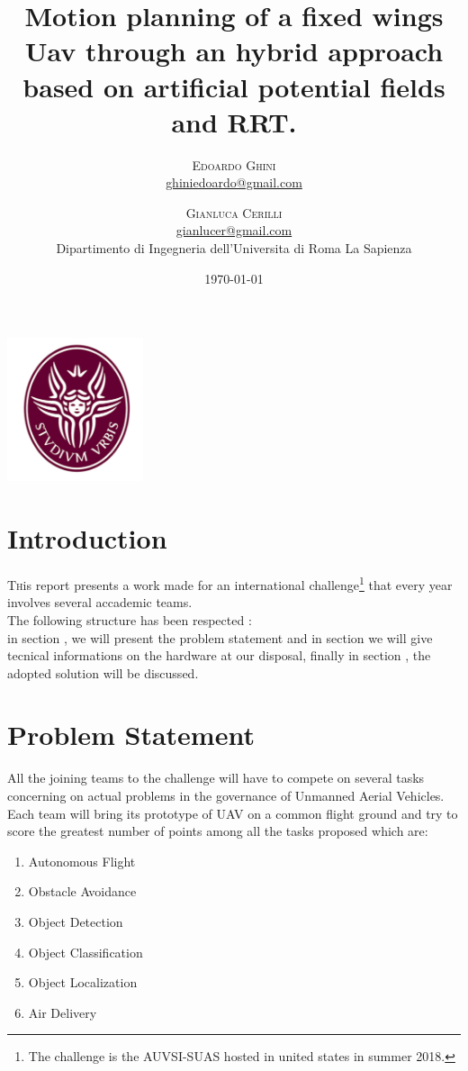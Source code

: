 \documentclass[oneside,onecolumn]{article}
\title{Motion planning of a fixed wings Uav through an hybrid approach based on artificial potential
  fields and RRT. } %
\author{%
  \textsc{Edoardo Ghini} \\[1ex] %
  \normalsize \href{mailto:ghiniedoardo@gmail.com}{ghiniedoardo@gmail.com} %
  \and %
  \textsc{Gianluca Cerilli} \\[1ex] %
  \normalsize \href{mailto:gianlucer@gmail.com}{gianlucer@gmail.com}\\ %
  \normalsize Dipartimento di Ingegneria dell'Universita di Roma La Sapienza\\
}
\date{\today} %
\begin{document}
\maketitle
\bigskip
\bigskip
\bigskip
\bigskip
\begin{center}
  \includegraphics[width=0.3\textwidth]{laSapienza}
\end{center}

\newpage
\section{Introduction}

\lettrine[nindent=0em,lines=3]{T}his report presents a work made
for an international challenge\footnote{The challenge is the AUVSI-SUAS hosted
  in united states in summer 2018.} that every year involves several accademic teams.\\
The following structure has been respected : \\
in section , we will present the problem statement and in section
 we will give tecnical informations on the hardware at our disposal,
finally in section , the adopted solution will be discussed.

\section{Problem Statement}
All the joining teams to the challenge will have to compete on several tasks
concerning on actual problems in the governance of Unmanned Aerial Vehicles.\\
Each team will bring its prototype of UAV on a common flight ground and try to
score the greatest number of points among all the tasks proposed which are:
\begin{enumerate}\centering
\item Autonomous Flight
\item Obstacle Avoidance
\item Object Detection
\item Object Classification
\item Object Localization 
\item Air Delivery
\end{enumerate}
\end{document}
